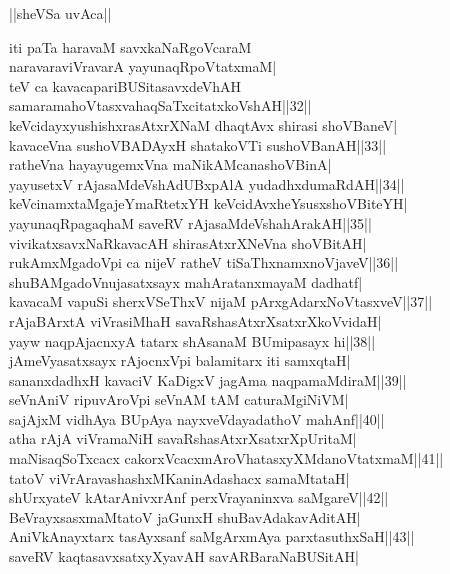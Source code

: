 \documentclass{article}
\begin{document}
\begin{center}
||sheVSa uvAca||
\end{center}

iti paTa haravaM savxkaNaRgoVcaraM\\
naravaraviVravarA yayunaqRpoVtatxmaM|\\
teV ca kavacapariBUSitasavxdeVhAH\\
samaramahoVtasxvahaqSaTxcitatxkoVshAH||32||\\
keVcidayxyushishxrasAtxrXNaM dhaqtAvx shirasi shoVBaneV|\\
kavaceVna sushoVBADAyxH shatakoVTi sushoVBanAH||33||\\
ratheVna hayayugemxVna maNikAMcanashoVBinA|\\
yayusetxV rAjasaMdeVshAdUBxpAlA yudadhxdumaRdAH||34||\\
keVcinamxtaMgajeYmaRtetxYH keVcidAvxheYsusxshoVBiteYH|\\
yayunaqRpagaqhaM saveRV rAjasaMdeVshahArakAH||35||\\
vivikatxsavxNaRkavacAH shirasAtxrXNeVna shoVBitAH|\\
rukAmxMgadoVpi ca nijeV ratheV tiSaThxnamxnoVjaveV||36||\\
shuBAMgadoVnujasatxsayx mahAratanxmayaM dadhatf|\\
kavacaM vapuSi sherxVSeThxV nijaM pArxgAdarxNoVtasxveV||37||\\
rAjaBArxtA viVrasiMhaH savaRshasAtxrXsatxrXkoVvidaH|\\
yayw naqpAjacnxyA tatarx shAsanaM BUmipasayx hi||38||\\
jAmeVyasatxsayx rAjocnxVpi balamitarx iti samxqtaH|\\
sananxdadhxH kavaciV KaDigxV jagAma naqpamaMdiraM||39||\\
seVnAniV ripuvAroVpi seVnAM tAM caturaMgiNiVM|\\
sajAjxM vidhAya BUpAya nayxveVdayadathoV mahAnf||40||\\
atha rAjA viVramaNiH savaRshasAtxrXsatxrXpUritaM|\\
maNisaqSoTxcacx cakorxVcacxmAroVhatasxyXMdanoVtatxmaM||41||\\
tatoV viVrAravashashxMKaninAdashacx samaMtataH|\\
shUrxyateV kAtarAnivxrAnf perxVrayaninxva saMgareV||42||\\
BeVrayxsasxmaMtatoV jaGunxH shuBavAdakavAditAH|\\
AniVkAnayxtarx tasAyxsanf saMgArxmAya parxtasuthxSaH||43||\\
saveRV kaqtasavxsatxyXyavAH savARBaraNaBUSitAH|\\
\end{document}
